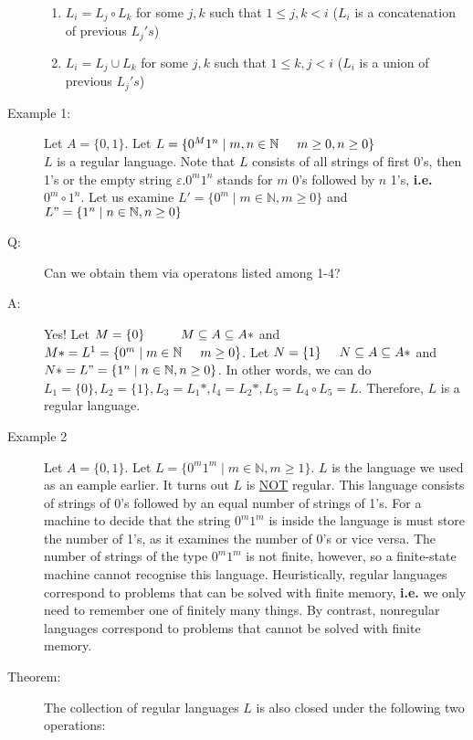 \documentclass[10pt]{article}
\begin{document}
\begin{description}
\begin{enumerate}
			\item $L_i = L_j \circ L_k$ for some $j, k$ such that $1 \leq j, k < i$ ($L_i$ is a concatenation of previous $L_j's$)
			\item $L_i = L_j \cup L_k$ for some $j, k$ such that $1 \leq k, j < i$ ($L_i$ is a union of previous $L_j's$)
		\end{enumerate}
		\item[Example 1:] Let $A = \{0, 1\}$. Let $L = \{0^M1^n \mid m, n \in \mathbb{N} \hspace{5mm} m \geq 0, n \geq 0 \}$ \\
		$L$ is a regular language. Note that $L$ consists of all strings of first 0's, then 1's or the empty string $\varepsilon. 0^m1^n$ stands for $m$ 0's followed by $n$ 1's, \textbf{i.e.} $0^m \circ 1^n$. Let us examine $L' = \{0^m \mid m \in \mathbb{N}, m \geq 0 \}$ and $L" = \{1^n \mid n \in \mathbb{N}, n \geq 0 \}$
		\item[Q:] Can we obtain them via operatons listed among 1-4?
		\item[A:] Yes! Let $M = \{ 0 \} \hspace{10mm} M \subseteq A \subseteq A*$ and $M* = L^1 = \{0^m \mid m \in \mathbb{N} \hspace{5mm} m \geq 0 \}$. Let $N = \{1\} \hspace{5mm} N \subseteq A \subseteq A*$ and $N* = L" = \{1^n \mid n \in \mathbb{N}, n \geq 0 \}$. In other words, we can do $L_1 = \{0\}, L_2 = \{1\}, L_3 = L_1*, l_4 = L_2*, L_5 = L_4 \circ L_5 = L$. Therefore, $L$ is a regular language.
		\item[Example 2] Let $A = \{0, 1\}$. Let $L = \{0^m1^m \mid m \in \mathbb{N}, m \geq 1 \}$. $L$ is the language we used as an eample earlier. It turns out $L$ is \underline{NOT} regular. This language consists of strings of 0's followed by an equal number of strings of 1's. For a machine to decide that the string $0^m1^m$ is  inside the language is must store the number of 1's, as it examines the number of 0's or vice versa. The number of strings of the type $0^m1^m$ is not finite, however, so a finite-state machine cannot recognise this language. Heuristically, regular languages correspond to problems that can be solved with finite memory, \textbf{i.e.} we only need to remember one of finitely many things. By contrast, nonregular languages correspond to problems that cannot be solved with finite memory.
		\item[Theorem:] The collection of regular languages $L$ is also closed under the following two operations:

\end{description}
\end{document}
